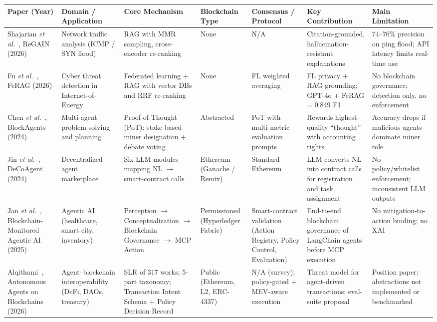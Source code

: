 \documentclass[10pt, conference]{IEEEtran}
\begin{document}
\begin{strip}
\centering
{}
\label{tab:related-work}
\scriptsize
\setlength{\tabcolsep}{2pt}
\renewcommand{\arraystretch}{1.12}
\begin{tabularx}{\textwidth}{@{}YYYYYYY@{}}
\toprule
\textbf{Paper (Year)} & \textbf{Domain / Application} & \textbf{Core Mechanism} & \textbf{Blockchain Type} & \textbf{Consensus / Protocol} & \textbf{Key Contribution} & \textbf{Main Limitation} \\
\midrule
Shajarian \textit{et al.}~\cite{shajarian2026}, ReGAIN (2026) & Network traffic analysis (ICMP / SYN flood) & RAG with MMR sampling, cross-encoder re-ranking & None & N/A & Citation-grounded, hallucination-resistant explanations & 74--76\% precision on ping flood; API latency limits real-time use \\
Fu \textit{et al.}~\cite{fu2026}, FeRAG (2026) & Cyber threat detection in Internet-of-Energy & Federated learning + RAG with vector DBs and RRF re-ranking & None & FL weighted averaging & FL privacy + RAG grounding; GPT-4o + FeRAG = 0.849 F1 & No blockchain governance; detection only, no enforcement \\
Chen \textit{et al.}~\cite{chen2024}, BlockAgents (2024) & Multi-agent problem-solving and planning & Proof-of-Thought (PoT): stake-based miner designation + debate voting & Abstracted & PoT with multi-metric evaluation prompts & Rewards highest-quality ``thought'' with accounting rights & Accuracy drops if malicious agents dominate miner role \\
Jin \textit{et al.}~\cite{jin2024}, DeCoAgent (2024) & Decentralized agent marketplace & Six LLM modules mapping NL $\rightarrow$ smart-contract calls & Ethereum (Ganache / Remix) & Standard Ethereum & LLM converts NL into contract calls for registration and task assignment & No policy/whitelist enforcement; inconsistent LLM outputs \\
Jan \textit{et al.}~\cite{jan2025}, Blockchain-Monitored Agentic AI (2025) & Agentic AI (healthcare, smart city, inventory) & Perception $\to$ Conceptualization $\to$ Blockchain Governance $\to$ MCP Action & Permissioned (Hyperledger Fabric) & Smart-contract validation (Action Registry, Policy Control, Evaluation) & End-to-end blockchain governance of LangChain agents before MCP execution & No mitigation-to-action binding; no XAI \\
Alqithami~\cite{alqithami2026}, Autonomous Agents on Blockchains (2026) & Agent--blockchain interoperability (DeFi, DAOs, treasury) & SLR of 317 works; 5-part taxonomy; Transaction Intent Schema + Policy Decision Record & Public (Ethereum, L2, ERC-4337) & N/A (survey); policy-gated + MEV-aware execution & Threat model for agent-driven transactions; eval-suite proposal & Position paper; abstractions not implemented or benchmarked \\

\end{tabularx}
\end{strip}
\end{document}
